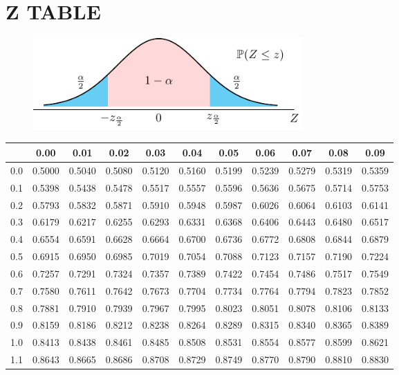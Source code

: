 \chapter{Z TABLE}
\begin{figure}[H]
	\centering
	\includegraphics[width=0.5\textwidth]{Figures/Apdx_StdNor.pdf}
\end{figure}
\begin{table}[ht]
	\centering
	\begin{tabular}{|c||cccccccccc|}
		\hline
	 & 0.00 & 0.01 & 0.02 & 0.03 & 0.04 & 0.05 & 0.06 & 0.07 & 0.08 & 0.09 \\ 
		\hline
		0.0 & 0.5000 & 0.5040 & 0.5080 & 0.5120 & 0.5160 & 0.5199 & 0.5239 & 0.5279 & 0.5319 & 0.5359 \\ 
		0.1 & 0.5398 & 0.5438 & 0.5478 & 0.5517 & 0.5557 & 0.5596 & 0.5636 & 0.5675 & 0.5714 & 0.5753 \\ 
		0.2 & 0.5793 & 0.5832 & 0.5871 & 0.5910 & 0.5948 & 0.5987 & 0.6026 & 0.6064 & 0.6103 & 0.6141 \\ 
		0.3 & 0.6179 & 0.6217 & 0.6255 & 0.6293 & 0.6331 & 0.6368 & 0.6406 & 0.6443 & 0.6480 & 0.6517 \\ 
		0.4 & 0.6554 & 0.6591 & 0.6628 & 0.6664 & 0.6700 & 0.6736 & 0.6772 & 0.6808 & 0.6844 & 0.6879 \\ 
		\hline
		0.5 & 0.6915 & 0.6950 & 0.6985 & 0.7019 & 0.7054 & 0.7088 & 0.7123 & 0.7157 & 0.7190 & 0.7224 \\ 
		0.6 & 0.7257 & 0.7291 & 0.7324 & 0.7357 & 0.7389 & 0.7422 & 0.7454 & 0.7486 & 0.7517 & 0.7549 \\ 
		0.7 & 0.7580 & 0.7611 & 0.7642 & 0.7673 & 0.7704 & 0.7734 & 0.7764 & 0.7794 & 0.7823 & 0.7852 \\ 
		0.8 & 0.7881 & 0.7910 & 0.7939 & 0.7967 & 0.7995 & 0.8023 & 0.8051 & 0.8078 & 0.8106 & 0.8133 \\ 
		0.9 & 0.8159 & 0.8186 & 0.8212 & 0.8238 & 0.8264 & 0.8289 & 0.8315 & 0.8340 & 0.8365 & 0.8389 \\ 
		\hline
		1.0 & 0.8413 & 0.8438 & 0.8461 & 0.8485 & 0.8508 & 0.8531 & 0.8554 & 0.8577 & 0.8599 & 0.8621 \\ 
		1.1 & 0.8643 & 0.8665 & 0.8686 & 0.8708 & 0.8729 & 0.8749 & 0.8770 & 0.8790 & 0.8810 & 0.8830 \\ 

\end{tabular}
\end{table}
